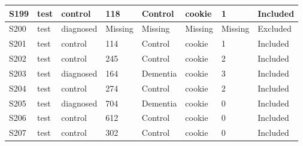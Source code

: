 \begin{center}
\begin{longtable}{|l|l|l|l|l|l|l|l|}
S199           & test                  & control           & 118     & Control        & cookie          & 1            & Included      \\ \hline
S200           & test                  & diagnosed         & Missing & Missing        & Missing         & Missing      & Excluded      \\ \hline
S201           & test                  & control           & 114     & Control        & cookie          & 1            & Included      \\ \hline
S202           & test                  & control           & 245     & Control        & cookie          & 2            & Included      \\ \hline
S203           & test                  & diagnosed         & 164     & Dementia       & cookie          & 3            & Included      \\ \hline
S204           & test                  & control           & 274     & Control        & cookie          & 2            & Included      \\ \hline
S205           & test                  & diagnosed         & 704     & Dementia       & cookie          & 0            & Included      \\ \hline
S206           & test                  & control           & 612     & Control        & cookie          & 0            & Included      \\ \hline
S207           & test                  & control           & 302     & Control        & cookie          & 0            & Included      \\ \hline
\end{longtable}
\normalsize
\end{center}

